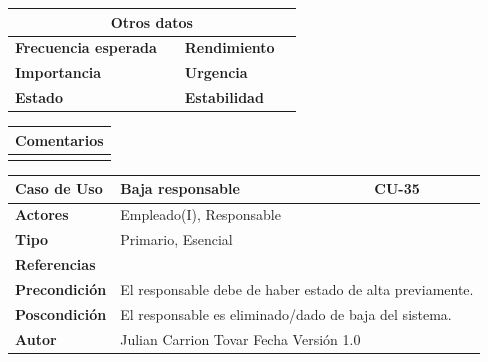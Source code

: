 \vspace{0.2cm}

\begin{table}[h!]
\centering
\begin{tabularx}{\textwidth}{|X|X|X|X|}
\hline
\multicolumn{4}{|c|}{\cellcolor[HTML]{F2F2F2}\textbf{Otros datos}} \\ \hline
\textbf{Frecuencia esperada} &  & \textbf{Rendimiento} &  \\ \hline
\textbf{Importancia} &  & \textbf{Urgencia} &  \\ \hline
\textbf{Estado} &  & \textbf{Estabilidad} &  \\ \hline
\end{tabularx}
\end{table}

\vspace{0.2cm}

\begin{table}[h!]
\centering
\begin{tabularx}{\textwidth}{|X|}
\hline
\cellcolor[HTML]{F2F2F2}\textbf{Comentarios} \\ \hline
\\ \hline
\end{tabularx}
\end{table}



\clearpage


\begin{table}[h!]
\centering
\begin{tabularx}{\textwidth}{|l|X|X|}
\hline
\textbf{Caso de Uso} & Baja responsable & CU-35 \\ \hline
\textbf{Actores} & \multicolumn{2}{l|}{Empleado(I), Responsable} \\ \hline
\textbf{Tipo} & \multicolumn{2}{l|}{Primario, Esencial} \\ \hline
\textbf{Referencias} & \multicolumn{2}{l|}{} \\ \hline
\textbf{Precondición} & \multicolumn{2}{l|}{El responsable debe de haber estado de alta previamente.} \\ \hline
\textbf{Poscondición} & \multicolumn{2}{l|}{El responsable es eliminado/dado de baja del sistema.} \\ \hline
\textbf{Autor} & \multicolumn{2}{l|}{Julian Carrion Tovar \hfill Fecha \hfill Versión 1.0} \\ \hline
\end{tabularx}
\end{table}

